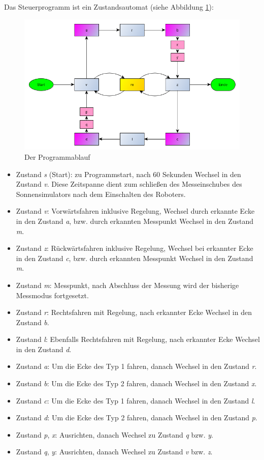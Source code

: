 \documentclass[a4paper,bibtotoc,oneside]{scrbook}
\begin{document}
Das Steuerprogramm ist ein Zustandsautomat (siehe Abbildung \ref{abl}):
\begin{figure}[!]
\centering
\includegraphics[width=150mm]{img/ablauf2.png}
\caption{Der Programmablauf}\label{abl}
\end{figure}
\begin{itemize}
\item Zustand \textit{s} (Start): zu Programmstart, nach 60 Sekunden Wechsel in den Zustand \textit{v}. Diese Zeitspanne dient zum schließen des Messeinschubes des Sonnensimulators nach dem Einschalten des Roboters.
\item Zustand \textit{v}: Vorwärtsfahren inklusive Regelung, Wechsel durch erkannte Ecke in den Zustand \textit{a}, bzw. durch erkannten Messpunkt Wechsel in den Zustand \textit{m}.
\item Zustand \textit{z}: Rückwärtsfahren inklusive Regelung, Wechsel bei erkannter Ecke in den Zustand \textit{c}, bzw. durch erkannten Messpunkt Wechsel in den Zustand \textit{m}.
\item Zustand \textit{m}: Messpunkt, nach Abschluss der Messung wird der bisherige Messmodus fortgesetzt.
\item Zustand \textit{r}: Rechtsfahren mit Regelung, nach erkannter Ecke Wechsel in den Zustand \textit{b}.
\item Zustand \textit{l}: Ebenfalls Rechtsfahren mit Regelung, nach erkannter Ecke Wechsel in den Zustand \textit{d}.
\item Zustand \textit{a}: Um die Ecke des Typ 1 fahren, danach Wechsel in den Zustand \textit{r}. 
\item Zustand \textit{b}: Um die Ecke des Typ 2 fahren, danach Wechsel in den Zustand \textit{x}.
\item Zustand \textit{c}: Um die Ecke des Typ 1 fahren, danach Wechsel in den Zustand \textit{l}. 
\item Zustand \textit{d}: Um die Ecke des Typ 2 fahren, danach Wechsel in den Zustand \textit{p}.
\item Zustand \textit{p}, \textit{x}: Ausrichten, danach Wechsel zu Zustand \textit{q} bzw. \textit{y}.
\item Zustand \textit{q}, \textit{y}: Ausrichten, danach Wechsel zu Zustand \textit{v} bzw. \textit{z}.
\end{itemize}
\end{document}
